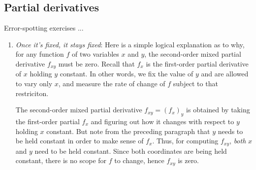 \documentclass[10pt]{amsart}
\begin{document}
\subsection{Partial derivatives}

Error-spotting exercises ...

\begin{enumerate}
\item {\em Once it's fixed, it stays fixed}: Here is a simple logical
  explanation as to why, for any function $f$ of two variables $x$ and
  $y$, the second-order mixed partial derivative $f_{xy}$ must be
  zero. Recall that $f_x$ is the first-order partial derivative of $x$
  holding $y$ constant. In other words, we fix the value of $y$ and
  are allowed to vary only $x$, and measure the rate of change of $f$
  subject to that restriciton.

  The second-order mixed partial derivative $f_{xy} = (f_x)_y$ is
  obtained by taking the first-order partial $f_x$ and figuring out
  how it changes with respect to $y$ holding $x$ constant. But note
  from the preceding paragraph that $y$ needs to be held constant in
  order to make sense of $f_x$. Thus, for computing $f_{xy}$, {\em
  both} $x$ and $y$ need to be held constant. Since both coordinates
  are being held constant, there is no scope for $f$ to change, hence
  $f_{xy}$ is zero.


\end{enumerate}
\end{document}
